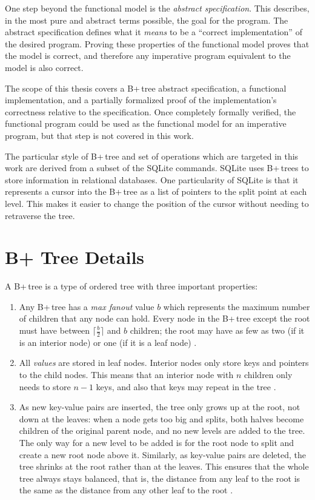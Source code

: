 \documentclass[12pt]{article}
\begin{document}
One step beyond the functional model is the \textit{abstract specification}. This describes, in the most pure and abstract terms possible, the goal for the program. The abstract specification defines what it \textit{means} to be a “correct implementation” of the desired program. Proving these properties of the functional model proves that the model is correct, and therefore any imperative program equivalent to the model is also correct.

The scope of this thesis covers a B+\,tree abstract specification, a functional implementation, and a partially formalized proof of the implementation’s correctness relative to the specification. Once completely formally verified, the functional program could be used as the functional model for an imperative program, but that step is not covered in this work. 

The particular style of B+\,tree and set of operations which are targeted in this work are derived from a subset of the SQLite commands. SQLite uses B+\,trees to store information in relational databases. One particularity of SQLite is that it represents a cursor into the B+\,tree as a list of pointers to the split point at each level. This makes it easier to change the position of the cursor without needing to retraverse the tree.

\clearpage

\section{B+ Tree Details} \label{sec:b+tree}

A B+\,tree is a type of ordered tree with three important properties:

\begin{enumerate}
\item Any B+\,tree has a \textit{max fanout} value $b$ which represents the maximum number of children that any node can hold. Every node in the B+\,tree except the root must have between $\lceil \frac{b}{2} \rceil$ and $b$ children; the root may have as few as two (if it is an interior node) or one (if it is a leaf node) \cite{elmasri_navathe_2011}.

\item All \textit{values} are stored in leaf nodes. Interior nodes only store keys and pointers to the child nodes. This means that an interior node with $n$ children only needs to store $n-1$ keys, and also that keys may repeat in the tree \cite{elmasri_navathe_2011}.

\item As new key-value pairs are inserted, the tree only grows up at the root, not down at the leaves: when a node gets too big and splits, both halves become children of the original parent node, and no new levels are added to the tree. The only way for a new level to be added is for the root node to split and create a new root node above it. Similarly, as key-value pairs are deleted, the tree shrinks at the root rather than at the leaves. This ensures that the whole tree always stays balanced, that is, the distance from any leaf to the root is the same as the distance from any other leaf to the root \cite{elmasri_navathe_2011}.
\end{enumerate}
\end{document}
